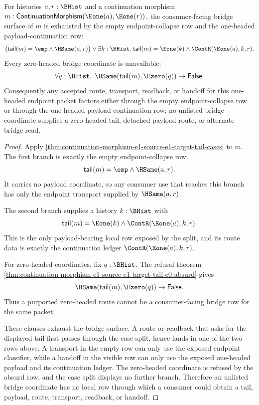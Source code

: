 \begin{lemma}
\label{lem:continuation-morphism-e1-source-e1-target-bridge-determinacy}
For histories $a,r:\BHist$ and a continuation morphism
$m:\mathsf{ContinuationMorphism}(\Eone(a),\Eone(r))$, the consumer-facing
bridge surface of $m$ is exhausted by the empty endpoint-collapse row and the
one-headed payload-continuation row:
$$
\bigl(\mathsf{tail}(m)=\emp\land\HSame(a,r)\bigr)
\lor
\exists k:\BHist.\;
\mathsf{tail}(m)=\Eone(k)\land\ContR(\Eone(a),k,r).
$$
Every zero-headed bridge coordinate is unavailable:
$$
\forall q:\BHist,\;
\HSame(\mathsf{tail}(m),\Ezero(q))\to\mathsf{False}.
$$
Consequently any accepted route, transport, readback, or handoff for this
one-headed endpoint packet factors either through the empty endpoint-collapse
row or through the one-headed payload-continuation row; no unlisted bridge
coordinate supplies a zero-headed tail, detached payload route, or alternate
bridge read.
\end{lemma}
\begin{proof}
Apply \autoref{thm:continuation-morphism-e1-source-e1-target-tail-cases} to
$m$. The first branch is exactly the empty endpoint-collapse row
$$
\mathsf{tail}(m)=\emp\land\HSame(a,r).
$$
It carries no payload coordinate, so any consumer use that reaches this branch
has only the endpoint transport supplied by $\HSame(a,r)$.

The second branch supplies a history $k:\BHist$ with
$$
\mathsf{tail}(m)=\Eone(k)\land\ContR(\Eone(a),k,r).
$$
This is the only payload-bearing local row exposed by the split, and its route
data is exactly the continuation ledger $\ContR(\Eone(a),k,r)$.

For zero-headed coordinates, fix $q:\BHist$. The refusal theorem
\autoref{thm:continuation-morphism-e1-source-e1-target-tail-e0-absurd} gives
$$
\HSame(\mathsf{tail}(m),\Ezero(q))\to\mathsf{False}.
$$
Thus a purported zero-headed route cannot be a consumer-facing bridge row for
the same packet.

These clauses exhaust the bridge surface. A route or readback that asks for the
displayed tail first passes through the case split, hence lands in one of the
two rows above. A transport in the empty row can only use the exposed endpoint
classifier, while a handoff in the visible row can only use the exposed
one-headed payload and its continuation ledger. The zero-headed coordinate is
refused by the absurd row, and the case split displays no further branch.
Therefore an unlisted bridge coordinate has no local row through which a
consumer could obtain a tail, payload, route, transport, readback, or handoff.
\end{proof}

